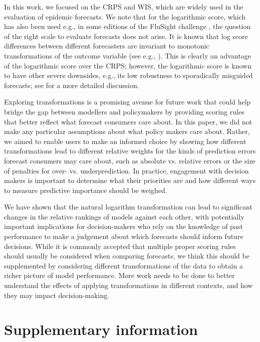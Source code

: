 \documentclass{article}
\begin{document}
In this work, we focused on the CRPS and WIS, which are widely used in the evaluation of epidemic forecasts. We note that for the logarithmic score, which has also been used e.g., in some editions of the FluSight challenge \cite{reichCollaborativeMultiyearMultimodel2019}, the question of the right scale to evaluate forecasts does not arise. It is known that log score differences between different forecasters are invariant to monotonic transformations of the outcome variable (see e.g., \citealt{diksLikelihoodbasedScoringRules2011}). This is clearly an advantage of the logarithmic score over the CRPS; however, the logarithmic score is known to have other severe downsides, e.g., its low robustness to sporadically misguided forecasts; see \cite{bracherEvaluatingEpidemicForecasts2021} for a more detailed discussion.

Exploring transformations is a promising avenue for future work that could help bridge the gap between modellers and policymakers by providing scoring rules that better reflect what forecast consumers care about. In this paper, we did not make any particular assumptions about what policy makers care about. Rather, we aimed to enable users to make an informed choice by showing how different transformations lead to different relative weights for the kinds of prediction errors forecast consumers may care about, such as absolute vs. relative errors or the size of penalties for over- vs. underprediction. In practice, engagement with decision makers is important to determine what their priorities are and how different ways to measure predictive importance should be weighed.  

We have shown that the natural logarithm transformation can lead to significant changes in the relative rankings of models against each other, with potentially important implications for decision-makers who rely on the knowledge of past performance to make a judgement about which forecasts should inform future decisions. While it is commonly accepted that multiple proper scoring rules should usually be considered when comparing forecasts, we think this should be supplemented by considering different transformations of the data to obtain a richer picture of model performance. More work needs to be done to better understand the effects of applying transformations in different contexts, and how they may impact decision-making. 

\newpage

\appendix
\section{Supplementary information}
\end{document}

